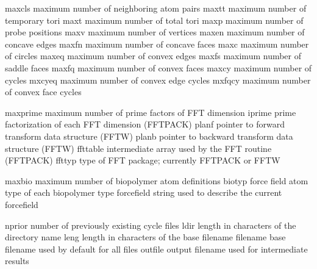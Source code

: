 \documentclass[letterpaper,11pt,english]{sphinxmanual}
\begin{document}

\begin{sphinxVerbatim}[commandchars=\\\{\}]
maxcls          maximum number of neighboring atom pairs
maxtt           maximum number of temporary tori
maxt            maximum number of total tori
maxp            maximum number of probe positions
maxv            maximum number of vertices
maxen           maximum number of concave edges
maxfn           maximum number of concave faces
maxc            maximum number of circles
maxeq           maximum number of convex edges
maxfs           maximum number of saddle faces
maxfq           maximum number of convex faces
maxcy           maximum number of cycles
mxcyeq          maximum number of convex edge cycles
mxfqcy          maximum number of convex face cycles
\end{sphinxVerbatim}


\begin{sphinxVerbatim}[commandchars=\\\{\}]
maxprime        maximum number of prime factors of FFT dimension
iprime          prime factorization of each FFT dimension (FFTPACK)
planf           pointer to forward transform data structure (FFTW)
planb           pointer to backward transform data structure (FFTW)
ffttable        intermediate array used by the FFT routine (FFTPACK)
ffttyp          type of FFT package; currently FFTPACK or FFTW
\end{sphinxVerbatim}


\begin{sphinxVerbatim}[commandchars=\\\{\}]
maxbio          maximum number of biopolymer atom definitions
biotyp          force field atom type of each biopolymer type
forcefield      string used to describe the current forcefield
\end{sphinxVerbatim}


\begin{sphinxVerbatim}[commandchars=\\\{\}]
nprior          number of previously existing cycle files
ldir            length in characters of the directory name
leng            length in characters of the base filename
filename        base filename used by default for all files
outfile         output filename used for intermediate results
\end{sphinxVerbatim}
\end{document}
